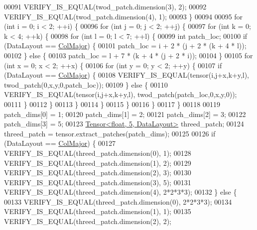 \begin{DoxyCode}
00091     VERIFY\_IS\_EQUAL(twod\_patch.dimension(3), 2);
00092     VERIFY\_IS\_EQUAL(twod\_patch.dimension(4), 1);
00093   \}
00094 
00095   \textcolor{keywordflow}{for} (\textcolor{keywordtype}{int} i = 0; i < 2; ++i) \{
00096     \textcolor{keywordflow}{for} (\textcolor{keywordtype}{int} j = 0; j < 2; ++j) \{
00097       \textcolor{keywordflow}{for} (\textcolor{keywordtype}{int} k = 0; k < 4; ++k) \{
00098         \textcolor{keywordflow}{for} (\textcolor{keywordtype}{int} l = 0; l < 7; ++l) \{
00099           \textcolor{keywordtype}{int} patch\_loc;
00100           \textcolor{keywordflow}{if} (DataLayout == \hyperlink{group__enums_ggaacded1a18ae58b0f554751f6cdf9eb13a0cbd4bdd0abcfc0224c5fcb5e4f6669a}{ColMajor}) \{
00101             patch\_loc = i + 2 * (j + 2 * (k + 4 * l));
00102           \} \textcolor{keywordflow}{else} \{
00103             patch\_loc = l + 7 * (k + 4 * (j + 2 * i));
00104           \}
00105           \textcolor{keywordflow}{for} (\textcolor{keywordtype}{int} x = 0; x < 2; ++x) \{
00106             \textcolor{keywordflow}{for} (\textcolor{keywordtype}{int} y = 0; y < 2; ++y) \{
00107               \textcolor{keywordflow}{if} (DataLayout == \hyperlink{group__enums_ggaacded1a18ae58b0f554751f6cdf9eb13a0cbd4bdd0abcfc0224c5fcb5e4f6669a}{ColMajor}) \{
00108                 VERIFY\_IS\_EQUAL(tensor(i,j+x,k+y,l), twod\_patch(0,x,y,0,patch\_loc));
00109               \} \textcolor{keywordflow}{else} \{
00110                 VERIFY\_IS\_EQUAL(tensor(i,j+x,k+y,l), twod\_patch(patch\_loc,0,x,y,0));
00111               \}
00112             \}
00113           \}
00114         \}
00115       \}
00116     \}
00117   \}
00118 
00119   patch\_dims[0] = 1;
00120   patch\_dims[1] = 2;
00121   patch\_dims[2] = 3;
00122   patch\_dims[3] = 5;
00123   \hyperlink{class_eigen_1_1_tensor}{Tensor<float, 5, DataLayout>} threed\_patch;
00124   threed\_patch = tensor.extract\_patches(patch\_dims);
00125 
00126   \textcolor{keywordflow}{if} (DataLayout == \hyperlink{group__enums_ggaacded1a18ae58b0f554751f6cdf9eb13a0cbd4bdd0abcfc0224c5fcb5e4f6669a}{ColMajor}) \{
00127     VERIFY\_IS\_EQUAL(threed\_patch.dimension(0), 1);
00128     VERIFY\_IS\_EQUAL(threed\_patch.dimension(1), 2);
00129     VERIFY\_IS\_EQUAL(threed\_patch.dimension(2), 3);
00130     VERIFY\_IS\_EQUAL(threed\_patch.dimension(3), 5);
00131     VERIFY\_IS\_EQUAL(threed\_patch.dimension(4), 2*2*3*3);
00132   \} \textcolor{keywordflow}{else} \{
00133     VERIFY\_IS\_EQUAL(threed\_patch.dimension(0), 2*2*3*3);
00134     VERIFY\_IS\_EQUAL(threed\_patch.dimension(1), 1);
00135     VERIFY\_IS\_EQUAL(threed\_patch.dimension(2), 2);

\end{DoxyCode}
